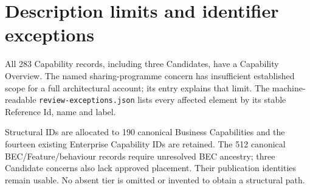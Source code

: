 \chapter{Description limits and identifier exceptions}\label{model:exceptions}
All 283 Capability records, including three Candidates, have a Capability Overview. The named sharing-programme concern has insufficient established scope for a full architectural account; its entry explains that limit. The machine-readable \texttt{review-exceptions.json} lists every affected element by its stable Reference Id, name and label.

Structural IDs are allocated to 190 canonical Business Capabilities and the fourteen existing Enterprise Capability IDs are retained. The 512 canonical BEC/Feature/behaviour records require unresolved BEC ancestry; three Candidate concerns also lack approved placement. Their publication identities remain usable. No absent tier is omitted or invented to obtain a structural path.


